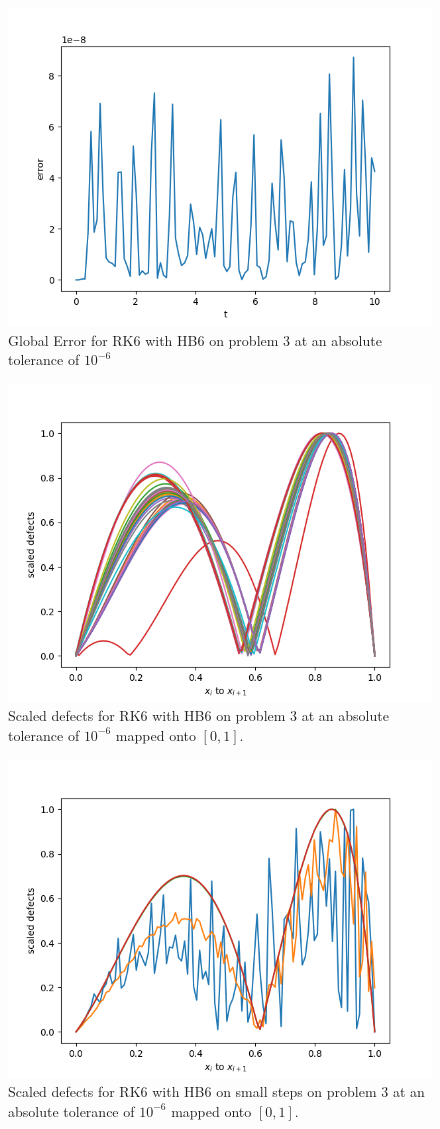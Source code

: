 \begin{figure}[H]
\centering
\includegraphics[width=0.7\linewidth]{./figures/rk6_with_hb6_p3_global_error}
\caption{Global Error for RK6 with HB6 on problem 3 at an absolute tolerance of $10^{-6}$}
\label{fig:rk6_with_hb6_p3_global_error}
\end{figure}

\begin{figure}[H]
\centering
\includegraphics[width=0.7\linewidth]{./figures/rk6_with_hb6_p3_scaled_defects}
\caption{Scaled defects for RK6 with HB6 on problem 3 at an absolute tolerance of $10^{-6}$ mapped onto $[0, 1]$.}
\label{fig:rk6_with_hb6_p3_scaled_defects}
\end{figure}

\begin{figure}[H]
\centering
\includegraphics[width=0.7\linewidth]{./figures/rk6_with_hb6_p3_scaled_defects_small_steps}
\caption{Scaled defects for RK6 with HB6 on small steps on problem 3 at an absolute tolerance of $10^{-6}$ mapped onto $[0, 1]$.}
\label{fig:rk6_with_hb6_p3_scaled_defects_small_steps}
\end{figure}

